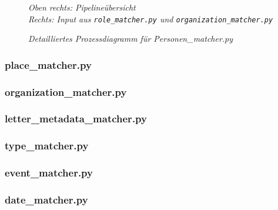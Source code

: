 \documentclass[12pt, a4paper, ngerman, bidi=default]{article}
\begin{document}
\begin{figure}[htbp]
{%
}%
  \caption{\small\textit{Detailliertes Prozessdiagramm für Personen\_matcher.py}}
  \label{fig:Assigned_roles_module.py}

  \smallskip
  \small\textit{Oben rechts: Pipelineübersicht \\ Rechts: Input aus \texttt{role\_matcher.py} und \texttt{organization\_matcher.py}}
\end{figure}



\subsubsection{place\_matcher.py}

\subsubsection{organization\_matcher.py}

\subsubsection{letter\_metadata\_matcher.py}

\subsubsection{type\_matcher.py}

\subsubsection{event\_matcher.py}



\subsubsection{date\_matcher.py}
\end{document}
